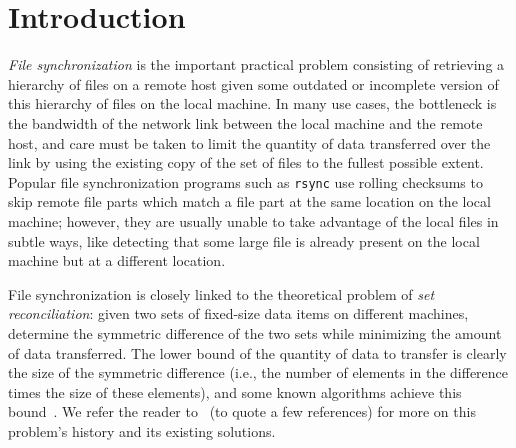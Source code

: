 \documentclass{llncs}
\newcommand{\rsync}{\texttt{rsync}\xspace}
\begin{document}

\section{Introduction}

\emph{File synchronization} is the important practical problem consisting of
retrieving a hierarchy of files on a remote host given some outdated or
incomplete version of this hierarchy of files on the local machine. In many use
cases, the bottleneck is the bandwidth of the network link between the local machine
and the remote host, and care must be taken to limit the quantity of data
transferred over the link by using the existing copy of the set of files to the
fullest possible extent. Popular file synchronization programs such as \rsync
use rolling checksums to skip remote file parts which match a file part at the
same location on the local machine; however, they are usually unable to take
advantage of the local files in subtle ways, like detecting that some large file
is already present on the local machine but at a different location.

File synchronization is closely linked to the theoretical problem of \emph{set
reconciliation}: given two sets of fixed-size data items on different machines,
determine the symmetric difference of the two sets while minimizing the amount
of data transferred. The lower bound of the quantity of data to transfer is
clearly the size of the symmetric difference (i.e., the number of elements in the
difference times the size of these elements), and some known algorithms achieve
this bound~\cite{PSRec}. We refer the reader to~\cite{byers,Whats,PSRec,Mins1} (to
quote a few references) for more on this problem's history and its existing
solutions.
\end{document}
